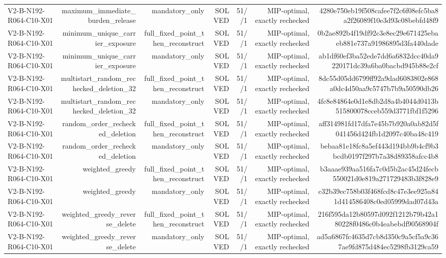 {\begin{longtable}{lrrrrrr}
V2-B-N192-R064-C10-X01 & maximum\_immediate\_burden\_release & mandatory\_only & SOLVED & 51//1 & MIP-optimal, exactly rechecked & 4280e750eb19f508cafee7f2c6f08efc5ba8a2f26089f10e3d93c08bebfd48f9 \\
V2-B-N192-R064-C10-X01 & minimum\_unique\_carrier\_exposure & full\_fixed\_point\_then\_reconstruct & SOLVED & 51//1 & MIP-optimal, exactly rechecked & 0b2ae892b4f19df92c3e8ec29e671425ebaeb881e737a91986895d3fa440dade \\
V2-B-N192-R064-C10-X01 & minimum\_unique\_carrier\_exposure & mandatory\_only & SOLVED & 51//1 & MIP-optimal, exactly rechecked & ab1df60ef3ba52ede7dd6a6832dcc40da9220171dc39a6ba0bacbd945b88e2cf \\
V2-B-N192-R064-C10-X01 & multistart\_random\_rechecked\_deletion\_32 & full\_fixed\_point\_then\_reconstruct & SOLVED & 51//1 & MIP-optimal, exactly rechecked & 8dc55d05dd6799ff92a9dad6083802e868a0dc4d50aa9c5747b7b9a50590db26 \\
V2-B-N192-R064-C10-X01 & multistart\_random\_rechecked\_deletion\_32 & mandatory\_only & SOLVED & 51//1 & MIP-optimal, exactly rechecked & 4fc8e84864e0d1e8db2d8a4b4044d0413b515800078cceb559d3771fbf1f5296 \\
V2-B-N192-R064-C10-X01 & random\_order\_rechecked\_deletion & full\_fixed\_point\_then\_reconstruct & SOLVED & 51//1 & MIP-optimal, exactly rechecked & aff314981fd17dfa7e45b7b920a0ab82d5f041456d424fb1d2097c40ba48c419 \\
V2-B-N192-R064-C10-X01 & random\_order\_rechecked\_deletion & mandatory\_only & SOLVED & 51//1 & MIP-optimal, exactly rechecked & bebaa81e18fc8a5ef443d194bb9b4cf9b3bcdb0197f297b7a38d89358afcc4b8 \\
V2-B-N192-R064-C10-X01 & weighted\_greedy & full\_fixed\_point\_then\_reconstruct & SOLVED & 51//1 & MIP-optimal, exactly rechecked & b3aaae939aa516fa7c0d5b2ac45d24fecb550021d0e819a271729483b3f828e9 \\
V2-B-N192-R064-C10-X01 & weighted\_greedy & mandatory\_only & SOLVED & 51//1 & MIP-optimal, exactly rechecked & c32b39ec758b03f468fcd8c47e3ee925a841d414586408c0ed05999dad07d43a \\
V2-B-N192-R064-C10-X01 & weighted\_greedy\_reverse\_delete & full\_fixed\_point\_then\_reconstruct & SOLVED & 51//1 & MIP-optimal, exactly rechecked & 216f595da12b80597d092f1212b79b42a180228f0486c0b4eabebdf90568904f \\
V2-B-N192-R064-C10-X01 & weighted\_greedy\_reverse\_delete & mandatory\_only & SOLVED & 51//1 & MIP-optimal, exactly rechecked & ad5a6867fc4635d7cb8d350c9a5cf5a9c367ae9fd875d484ec5298fb3129ca59 \\

\end{longtable}}
